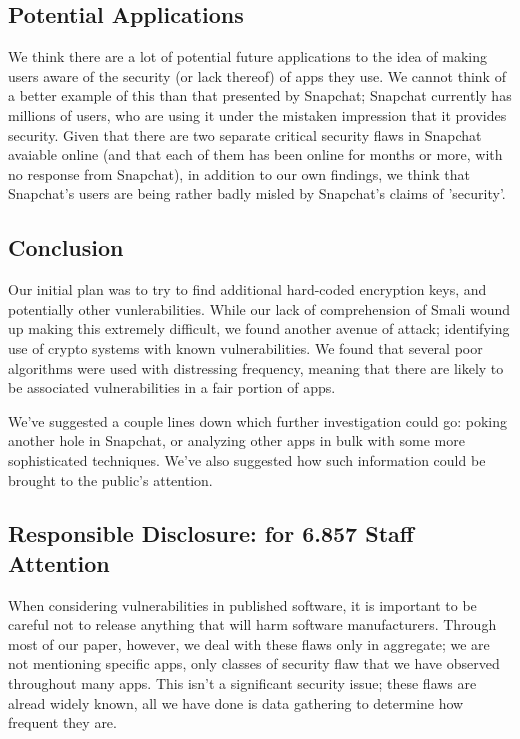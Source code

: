\documentclass[11pt]{article}
\numberwithin{theorem}{subsection}
\begin{document}
\subsection{Potential Applications}

We think there are a lot of potential future applications to the idea of making users aware of the security (or lack thereof) of apps they use.  We
cannot think of a better example of this than that presented by Snapchat; Snapchat currently has millions of users, who are using it under the
mistaken impression that it provides security.  Given that there are two separate critical security flaws in Snapchat avaiable online (and that
each of them has been online for months or more, with no response from Snapchat), in addition to our own findings, we think that Snapchat's users are being
rather badly misled by Snapchat's claims of 'security'.

\subsection{Conclusion}

Our initial plan was to try to find additional hard-coded encryption keys, and potentially other vunlerabilities.  While our lack of comprehension of Smali
wound up making this extremely difficult, we found another avenue of attack; identifying use of crypto systems with known vulnerabilities.  We found that 
several poor algorithms were used with distressing frequency, meaning that there are likely to be associated vulnerabilities in a fair portion of apps. 

We've suggested a couple lines down which further investigation could go: poking another hole in Snapchat, or analyzing other apps in bulk with some more
sophisticated techniques.  We've also suggested how such information could be brought to the public's attention.

\subsection{Responsible Disclosure: for 6.857 Staff Attention}

When considering vulnerabilities in published software, it is important to be careful not to release anything that will harm software manufacturers.
Through most of our paper, however, we deal with these flaws only in aggregate; we are not mentioning specific apps, only classes of security
flaw that we have observed throughout many apps.  This isn't a significant security issue; these flaws are alread widely known, all we have done is
data gathering to determine how frequent they are.
\end{document}
